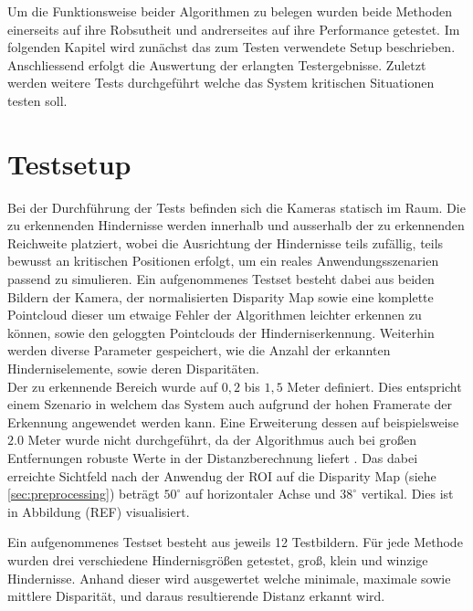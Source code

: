 Um die Funktionsweise beider Algorithmen zu belegen wurden beide Methoden einerseits auf ihre Robsutheit und andrerseites auf ihre Performance getestet. Im folgenden Kapitel wird zunächst das zum Testen verwendete Setup beschrieben. Anschliessend erfolgt die Auswertung der erlangten Testergebnisse. Zuletzt werden weitere Tests durchgeführt welche das System kritischen Situationen testen soll.

\section{Testsetup}
\label{sec:test_setup}

Bei der Durchführung der Tests befinden sich die Kameras statisch im Raum. Die zu erkennenden Hindernisse werden innerhalb und ausserhalb der zu erkennenden Reichweite platziert, wobei die Ausrichtung der Hindernisse teils zufällig, teils bewusst an kritischen Positionen erfolgt, um ein reales Anwendungsszenarien passend zu simulieren. Ein aufgenommenes Testset besteht dabei aus beiden Bildern der Kamera, der normalisierten Disparity Map sowie eine komplette Pointcloud dieser um etwaige Fehler der Algorithmen leichter erkennen zu können, sowie den geloggten Pointclouds der Hinderniserkennung. Weiterhin werden diverse Parameter gespeichert, wie die Anzahl der erkannten Hinderniselemente, sowie deren Disparitäten.\\

\noindent
Der zu erkennende Bereich wurde auf $0,2$ bis $1,5$ Meter definiert. Dies entspricht einem Szenario in welchem das System auch aufgrund der hohen Framerate der Erkennung angewendet werden kann. Eine Erweiterung dessen auf beispielsweise $2.0$ Meter wurde nicht durchgeführt, da der Algorithmus auch bei großen Entfernungen robuste Werte in der Distanzberechnung liefert \cite{hilleralhallak}.
Das dabei erreichte Sichtfeld nach der Anwendug der ROI auf die Disparity Map (siehe \ref{sec:preprocessing}) beträgt $50^{\circ}$ auf horizontaler Achse und $38^{\circ}$ vertikal. Dies ist in Abbildung (REF) visualisiert.

\noindent
Ein aufgenommenes Testset besteht aus jeweils 12 Testbildern. Für jede Methode wurden drei verschiedene Hindernisgrößen getestet, groß, klein und winzige Hindernisse. Anhand dieser wird ausgewertet welche minimale, maximale sowie mittlere Disparität, und daraus resultierende Distanz erkannt wird.\\

